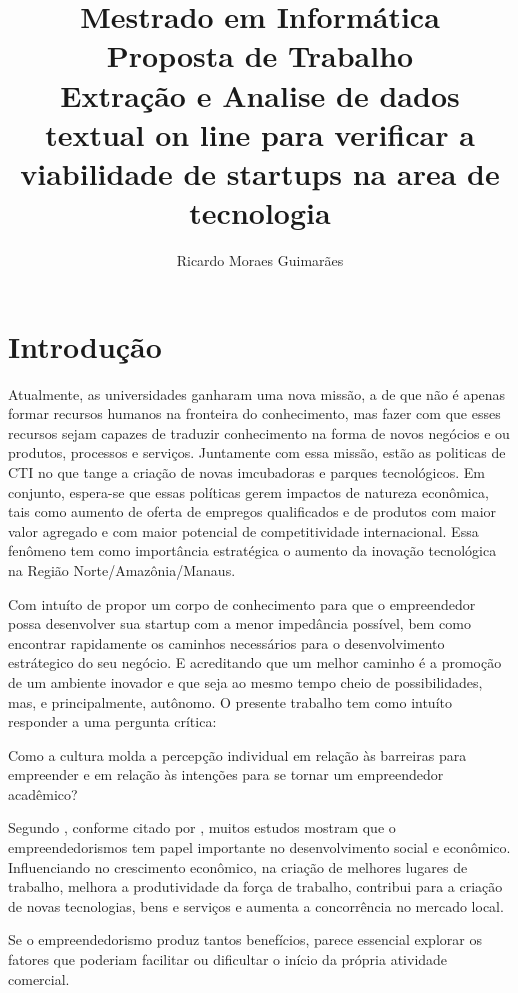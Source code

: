 \documentclass[12pt]{article}
\title{Mestrado em Informática\\ Proposta de Trabalho \\ Extração e Analise de dados textual on line para verificar a viabilidade de startups na area de tecnologia}
\author{Ricardo Moraes Guimarães\inst{1}}
\begin{document}
\maketitle

\section{Introdução} \label{sec:intro}

Atualmente, as universidades ganharam uma nova missão, a de que não é apenas formar recursos humanos na fronteira do conhecimento, mas fazer com que esses recursos sejam capazes de traduzir conhecimento na forma de novos negócios e ou produtos, processos e serviços. Juntamente com essa missão, estão as politicas de CTI no que tange a criação de novas imcubadoras e parques tecnológicos. Em conjunto, espera-se que essas políticas gerem impactos de natureza econômica, tais como aumento de oferta de empregos qualificados e de produtos com maior valor agregado e com maior potencial de competitividade internacional. Essa fenômeno tem como importância estratégica o aumento da inovação tecnológica na Região Norte/Amazônia/Manaus.

Com intuíto de propor um corpo de conhecimento para que o empreendedor possa desenvolver sua startup com a menor impedância possível, bem como encontrar rapidamente os caminhos necessários para o desenvolvimento estrátegico do seu negócio. E acreditando que um melhor caminho é a promoção de um ambiente inovador e que seja ao mesmo tempo cheio de possibilidades, mas, e principalmente, autônomo. O presente trabalho tem como intuíto responder a uma pergunta crítica:

Como a cultura molda a percepção individual em relação às barreiras para empreender e em relação às intenções para se tornar um empreendedor acadêmico?

Segundo \cite{dimitriadis2008opinia:2008}, conforme citado por \cite{staniewski2015motivating:2015}, muitos estudos mostram que o empreendedorismos tem papel importante no desenvolvimento social e econômico. Influenciando no crescimento econômico, na criação de melhores lugares de trabalho, melhora a produtividade da força de trabalho, contribui para a criação de novas tecnologias, bens e serviços e  aumenta a concorrência no mercado local.

Se o empreendedorismo produz tantos benefícios, parece essencial explorar os fatores que poderiam facilitar ou dificultar o início da própria atividade comercial.
\end{document}

